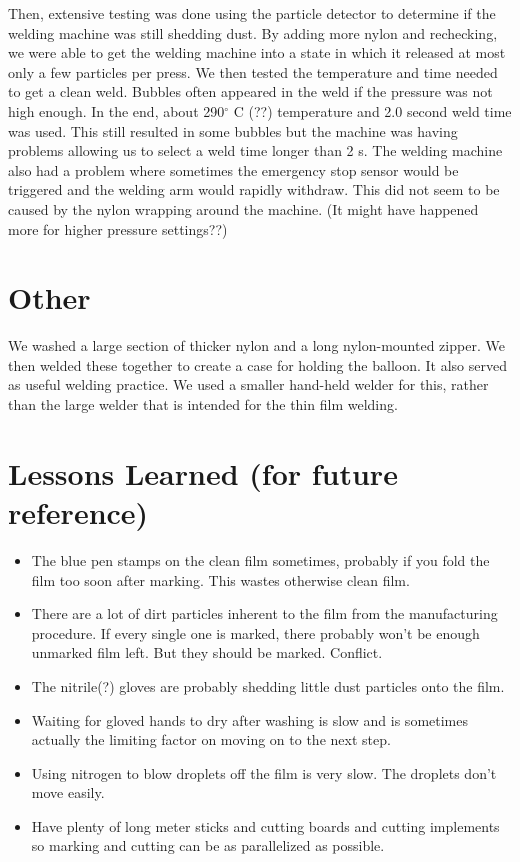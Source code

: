 \documentclass{article}
\begin{document}
Then, extensive testing was done using the particle detector to determine if the welding machine was still shedding dust.  By adding more nylon and rechecking, we were able to get the welding machine into a state in which it released at most only a few particles per press. We then tested the temperature and time needed to get a clean weld. Bubbles often appeared in the weld if the pressure was not high enough. In the end, about 290$^\circ$ C (??) temperature and 2.0 second weld time was used. This still resulted in some bubbles but the machine was having problems allowing us to select a weld time longer than 2 s.  The welding machine also had a problem where sometimes the emergency stop sensor would be triggered and the welding arm would rapidly withdraw. This did not seem to be caused by the nylon wrapping around the machine.  (It might have happened more for higher pressure settings??) 


\section{Other}
We washed a large section of thicker nylon and a long nylon-mounted zipper. We then welded these together to create a case for holding the balloon. It also served as useful welding practice. We used a smaller hand-held welder for this, rather than the large welder that is intended for the thin film welding. 

\section{Lessons Learned (for future reference)}
\begin{itemize}
\item The blue pen stamps on the clean film sometimes, probably if you fold the film too soon after marking. This wastes otherwise clean film.
\item There are a lot of dirt particles inherent to the film from the manufacturing procedure. If every single one is marked, there probably won't be enough unmarked film left. But they should be marked. Conflict. 
\item The nitrile(?) gloves are probably shedding little dust particles onto the film. 
\item Waiting for gloved hands to dry after washing is slow and is sometimes actually the limiting factor on moving on to the next step. 
\item Using nitrogen to blow droplets off the film is very slow. The droplets don't move easily.
\item Have plenty of long meter sticks and cutting boards and cutting implements so marking and cutting can be as parallelized as possible. 
\end{itemize}
\end{document}
